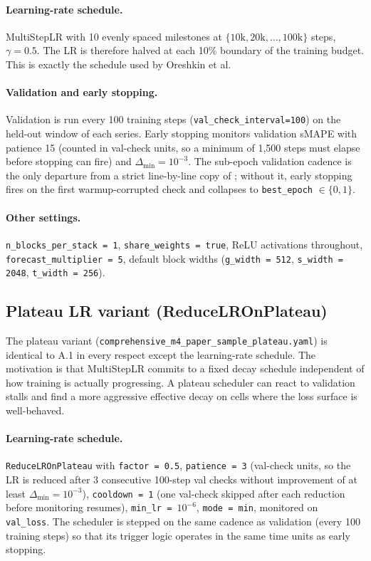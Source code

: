 \documentclass[11pt,a4paper]{article}
\begin{document}
\paragraph{Learning-rate schedule.} MultiStepLR with 10 evenly spaced milestones at $\{10\text{k}, 20\text{k}, \ldots, 100\text{k}\}$ steps, $\gamma = 0.5$. The LR is therefore halved at each 10\% boundary of the training budget. This is exactly the schedule used by Oreshkin et al.

\paragraph{Validation and early stopping.} Validation is run every 100 training steps (\texttt{val\_check\_interval=100}) on the held-out window of each series. Early stopping monitors validation sMAPE with patience 15 (counted in val-check units, so a minimum of 1{,}500 steps must elapse before stopping can fire) and $\Delta_{\min} = 10^{-3}$. The sub-epoch validation cadence is the only departure from a strict line-by-line copy of \citet{oreshkin2020nbeats}; without it, early stopping fires on the first warmup-corrupted check and collapses to \texttt{best\_epoch} $\in \{0, 1\}$.

\paragraph{Other settings.} \texttt{n\_blocks\_per\_stack = 1}, \texttt{share\_weights = true}, ReLU activations throughout, \texttt{forecast\_multiplier = 5}, default block widths (\texttt{g\_width = 512}, \texttt{s\_width = 2048}, \texttt{t\_width = 256}).

\subsection{Plateau LR variant (ReduceLROnPlateau)}

The plateau variant (\texttt{comprehensive\_m4\_paper\_sample\_plateau.yaml}) is identical to A.1 in every respect except the learning-rate schedule. The motivation is that MultiStepLR commits to a fixed decay schedule independent of how training is actually progressing. A plateau scheduler can react to validation stalls and find a more aggressive effective decay on cells where the loss surface is well-behaved.

\paragraph{Learning-rate schedule.} \texttt{ReduceLROnPlateau} with \texttt{factor = 0.5}, \texttt{patience = 3} (val-check units, so the LR is reduced after 3 consecutive 100-step val checks without improvement of at least $\Delta_{\min} = 10^{-3}$), \texttt{cooldown = 1} (one val-check skipped after each reduction before monitoring resumes), \texttt{min\_lr = $10^{-6}$}, \texttt{mode = min}, monitored on \texttt{val\_loss}. The scheduler is stepped on the same cadence as validation (every 100 training steps) so that its trigger logic operates in the same time units as early stopping.
\end{document}
